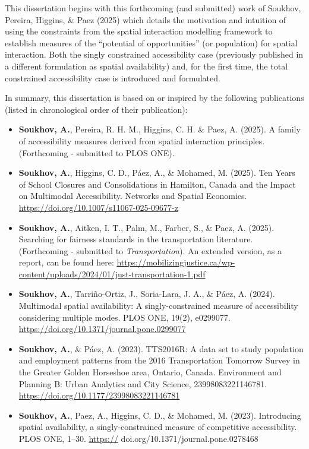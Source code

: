 \documentclass[
11pt, %
oneside, %
english, %
singlespacing, %
]{macthesis} %
\def\tightlist{}
\begin{document}
This dissertation begins with this forthcoming (and submitted) work of Soukhov, Pereira, Higgins, \& Paez (2025) which details the motivation and intuition of using the constraints from the spatial interaction modelling framework to establish measures of the ``potential of opportunities'' (or population) for spatial interaction. Both the singly constrained accessibility case (previously published in a different formulation as spatial availability) and, for the first time, the total constrained accessibility case is introduced and formulated.

In summary, this dissertation is based on or inspired by the following publications (listed in chronological order of their publication):

\begin{itemize}
\tightlist
\item
  \textbf{Soukhov, A.}, Pereira, R. H. M., Higgins, C. H. \& Paez, A. (2025). A family of accessibility measures derived from spatial interaction principles. (Forthcoming - submitted to PLOS ONE).
\item
  \textbf{Soukhov, A.}, Higgins, C. D., Páez, A., \& Mohamed, M. (2025). Ten Years of School Closures and Consolidations in Hamilton, Canada and the Impact on Multimodal Accessibility. Networks and Spatial Economics. \url{https://doi.org/10.1007/s11067-025-09677-z}
\item
  \textbf{Soukhov, A.}, Aitken, I. T., Palm, M., Farber, S., \& Paez, A. (2025). Searching for fairness standards in the transportation literature. (Forthcoming - submitted to \emph{Transportation}). An extended version, as a report, can be found here: \url{https://mobilizingjustice.ca/wp-content/uploads/2024/01/just-transportation-1.pdf}
\item
  \textbf{Soukhov, A.}, Tarriño-Ortiz, J., Soria-Lara, J. A., \& Páez, A. (2024). Multimodal spatial availability: A singly-constrained measure of accessibility considering multiple modes. PLOS ONE, 19(2), e0299077. \url{https://doi.org/10.1371/journal.pone.0299077}
\item
  \textbf{Soukhov, A.}, \& Páez, A. (2023). TTS2016R: A data set to study population and employment patterns from the 2016 Transportation Tomorrow Survey in the Greater Golden Horseshoe area, Ontario, Canada. Environment and Planning B: Urban Analytics and City Science, 23998083221146781. \url{https://doi.org/10.1177/23998083221146781}
\item
  \textbf{Soukhov, A.}, Paez, A., Higgins, C. D., \& Mohamed, M. (2023). Introducing spatial availability, a singly-constrained measure of competitive accessibility. PLOS ONE, 1--30. \url{https://} doi.org/10.1371/journal.pone.0278468
\end{itemize}
\end{document}
